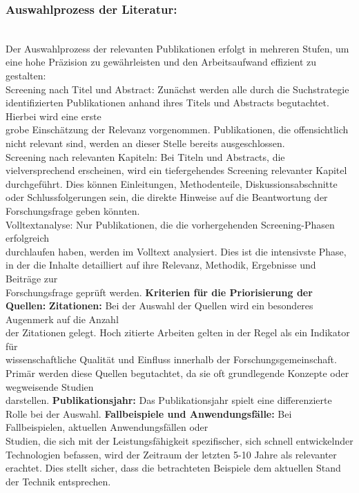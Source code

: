 \subsubsection{Auswahlprozess der Literatur:} 
\\
Der Auswahlprozess der relevanten Publikationen erfolgt in mehreren Stufen, um eine hohe Präzision zu gewährleisten und den Arbeitsaufwand effizient zu gestalten:
\\
    Screening nach Titel und Abstract: Zunächst werden alle durch die Suchstrategie identifizierten Publikationen anhand ihres Titels und Abstracts begutachtet. Hierbei wird eine erste \\ grobe Einschätzung der Relevanz vorgenommen. Publikationen, die offensichtlich nicht relevant sind, werden an dieser Stelle bereits ausgeschlossen.
\\
    Screening nach relevanten Kapiteln: Bei Titeln und Abstracts, die vielversprechend erscheinen, wird ein tiefergehendes Screening relevanter Kapitel durchgeführt. Dies können Einleitungen, Methodenteile, Diskussionsabschnitte oder Schlussfolgerungen sein, die direkte Hinweise auf die Beantwortung der Forschungsfrage geben könnten.
\\
    Volltextanalyse: Nur Publikationen, die die vorhergehenden Screening-Phasen erfolgreich \\ durchlaufen haben, werden im Volltext analysiert. Dies ist die intensivste Phase, \\ in der die Inhalte detailliert auf ihre Relevanz, Methodik, Ergebnisse und Beiträge zur \\ Forschungsfrage geprüft werden.
\nAbsatz
\textbf{Kriterien für die Priorisierung der Quellen:}
\nAbsatz
    \textbf{Zitationen:} Bei der Auswahl der Quellen wird ein besonderes Augenmerk auf die Anzahl \\ der Zitationen gelegt. Hoch zitierte Arbeiten gelten in der Regel als ein Indikator für \\ wissenschaftliche Qualität und Einfluss innerhalb der Forschungsgemeinschaft. Primär werden diese Quellen begutachtet, da sie oft grundlegende Konzepte oder wegweisende Studien \\ darstellen.
\nAbsatz
    \textbf{Publikationsjahr:} Das Publikationsjahr spielt eine differenzierte Rolle bei der Auswahl. \nAbsatz
       \textbf{ Fallbeispiele und Anwendungsfälle:} Bei Fallbeispielen, aktuellen Anwendungsfällen oder \\ Studien, die sich mit der Leistungsfähigkeit spezifischer, sich schnell entwickelnder Technologien befassen, wird der Zeitraum der letzten 5-10 Jahre als relevanter erachtet. Dies stellt sicher, dass die betrachteten Beispiele dem aktuellen Stand der Technik entsprechen.\nAbsatz
